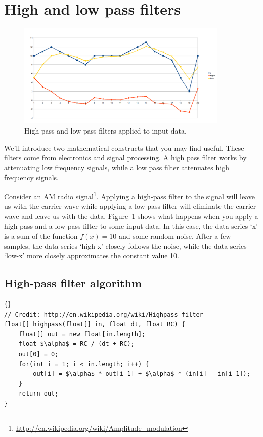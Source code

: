 \documentclass[10pt]{article}
\begin{document}
\section{High and low pass filters}

\begin{figure}[ht]
\begin{center}
\includegraphics[width=0.9\textwidth]{Filters-example.png}
\end{center}
\caption{\label{fig:Filters}High-pass and low-pass filters applied to input data.}
\end{figure}

We'll introduce two mathematical constructs that you may find useful. These filters come from electronics and signal processing. A high pass filter works by attenuating low frequency signals, while a low pass filter attenuates high frequency signals. 

Consider an AM radio
signal\footnote{\url{http://en.wikipedia.org/wiki/Amplitude_modulation}}. Applying a high-pass
filter to the signal will leave us with the carrier wave while
applying a low-pass filter will eliminate the carrier wave and leave
us with the data.
Figure~\ref{fig:Filters} shows what happens when you apply a high-pass and a low-pass filter to some input data. In this case, the data series `x' is a sum of the function $f(x)=10$ and some random noise. After a few samples, the data series `high-x' closely follows the noise, while the data series `low-x' more closely approximates the constant value 10.

\subsection{High-pass filter algorithm}
\begin{lstlisting}[frame=trbl]{}
// Credit: http://en.wikipedia.org/wiki/Highpass_filter
float[] highpass(float[] in, float dt, float RC) {
	float[] out = new float[in.length];
	float $\alpha$ = RC / (dt + RC);
	out[0] = 0;
	for(int i = 1; i < in.length; i++) {
		out[i] = $\alpha$ * out[i-1] + $\alpha$ * (in[i] - in[i-1]);
	}
	return out;
}
\end{lstlisting}
\end{document}
